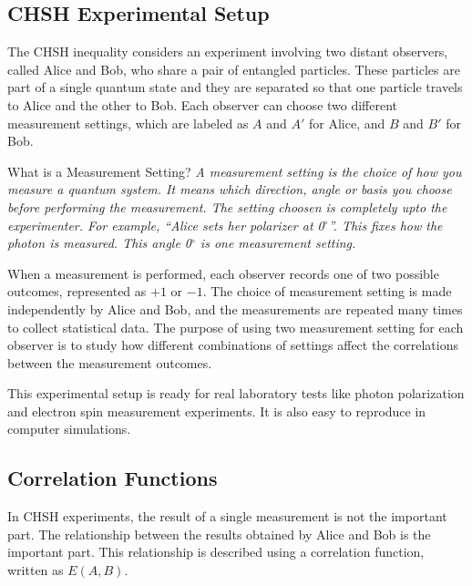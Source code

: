 \documentclass[17pt,a4paper]{extarticle}
\begin{document}
\subsection*{CHSH Experimental Setup}
The CHSH inequality considers an experiment involving two distant observers, called Alice and Bob, who share a pair of entangled particles. These particles are part of a single quantum state and they are separated so that one particle travels to Alice and the other to Bob. Each observer can choose two different measurement settings, which are labeled as $A$ and $A'$ for Alice, and $B$ and $B'$ for Bob.

\begin{conceptbox}{What is a Measurement Setting?}
\textit{A measurement setting is the choice of how you measure a quantum system. It means which direction, angle or basis you choose before performing the measurement. The setting choosen is completely upto the experimenter. For example, ``Alice sets her polarizer at 0$^\circ$''. This fixes how the photon is measured. This angle 0$^\circ$ is one measurement setting.}
\end{conceptbox}

When a measurement is performed, each observer records one of two possible outcomes, represented as $+1$ or $-1$. The choice of measurement setting is made independently by Alice and Bob, and the measurements are repeated many times to collect statistical data. The purpose of using two measurement setting for each observer is to study how different combinations of settings affect the correlations between the measurement outcomes.

This experimental setup is ready for real laboratory tests like photon polarization and electron spin measurement experiments. It is also easy to reproduce in computer simulations.

\subsection*{Correlation Functions}
In CHSH experiments, the result of a single measurement is not the important part. The relationship between the results obtained by Alice and Bob is the important part. This relationship is described using a correlation function, written as $E(A,B)$.
\end{document}
